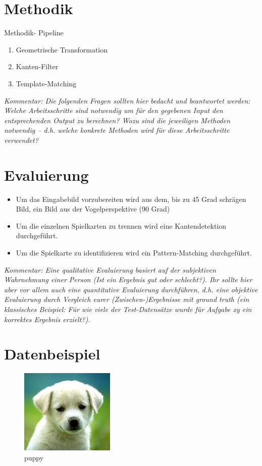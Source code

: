 \documentclass[deutsch]{scrartcl}
\begin{document}
\section{Methodik}
Methodik- Pipeline
\begin{enumerate}
	\item Geometrische Transformation
	\item Kanten-Filter
	\item Template-Matching
\end{enumerate}
\textit{Kommentar: Die folgenden Fragen sollten hier bedacht und beantwortet werden: Welche Arbeitsschritte sind notwendig um für den gegebenen Input den entsprechenden Output zu berechnen? Wozu sind die jeweiligen Methoden notwendig – d.h. welche konkrete Methoden wird für diese Arbeitsschritte verwendet?}
\section{Evaluierung}
\begin{itemize}
	\item Um das Eingabebild vorzubereiten wird aus dem, bis zu 45 Grad schrägen Bild, ein Bild aus der Vogelperspektive (90 Grad)
	\item Um die einzelnen Spielkarten zu trennen wird eine Kantendetektion durchgeführt.
	\item Um die Spielkarte zu identifizieren wird ein Pattern-Matching durchgeführt.
\end{itemize}
\textit{Kommentar: Eine qualitative Evaluierung basiert auf der subjektiven Wahrnehmung einer Person (Ist ein Ergebnis gut oder schlecht?). Ihr sollte hier aber vor allem auch eine quantitative Evaluierung durchführen, d.h. eine objektive Evaluierung durch Vergleich eurer (Zwischen-)Ergebnisse mit ground truth (ein klassisches Beispiel: Für wie viele der Test-Datensätze wurde für Aufgabe xy ein korrektes Ergebnis erzielt?).}
\section{Datenbeispiel}
\begin{figure}[h!]
 \centering
 \includegraphics[width=0.4\textwidth]{img.jpg}
 \caption{puppy}
 \label{fig:img}
\end{figure}
\end{document}
